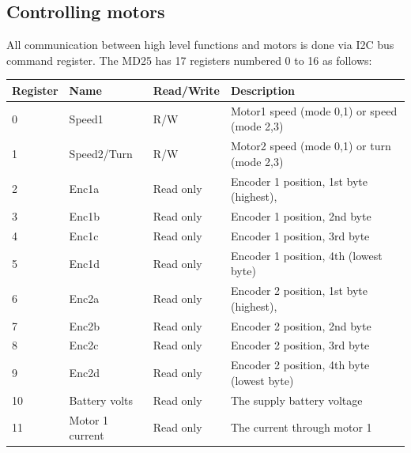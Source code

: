 \documentclass[11pt]{article}
\begin{document}
\subsection{Controlling motors}

All communication between high level functions and motors is done via  I2C bus command register.
The MD25 has 17 registers numbered 0 to 16 as follows:
\begin{table}[h]
	\begin{tabular}{@{}llll@{}}
		\toprule
		\textbf{Register} & \textbf{Name}     & \textbf{Read/Write} & \textbf{Description}                                             \\ \midrule
		0                 & Speed1            & R/W                 & Motor1 speed (mode 0,1) or speed (mode 2,3)                      \\
		1                 & Speed2/Turn       & R/W                 & Motor2 speed (mode 0,1) or turn (mode 2,3)                       \\
		2                 & Enc1a             & Read only           & Encoder 1 position, 1st byte (highest),   \\
		3                 & Enc1b             & Read only           & Encoder 1 position, 2nd byte                                     \\
		4                 & Enc1c             & Read only           & Encoder 1 position, 3rd byte                                     \\
		5                 & Enc1d             & Read only           & Encoder 1 position, 4th (lowest byte)                            \\
		6                 & Enc2a             & Read only           & Encoder 2 position, 1st  byte (highest),  \\
		7                 & Enc2b             & Read only           & Encoder 2 position, 2nd byte                                     \\
		8                 & Enc2c             & Read only           & Encoder 2 position, 3rd byte                                     \\
		9                 & Enc2d             & Read only           & Encoder 2 position, 4th byte (lowest byte)                       \\
		10                & Battery volts     & Read only           & The supply battery voltage                                       \\
		11                & Motor 1 current   & Read only           & The current through motor 1                                      \\

\end{tabular}
\end{table}
\end{document}

